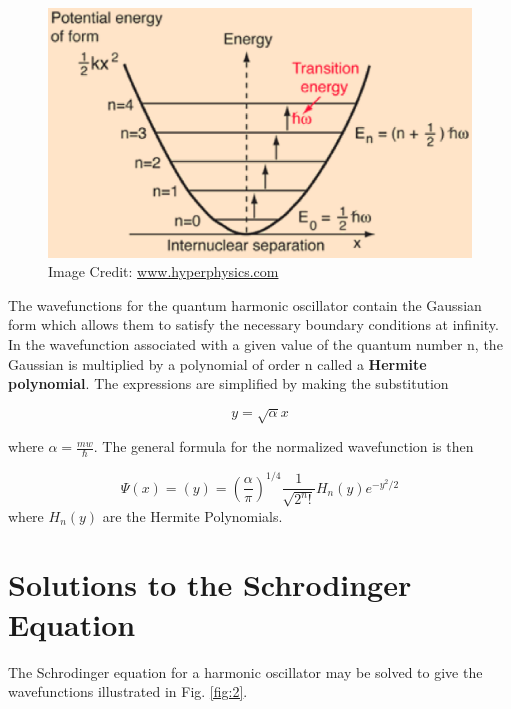 \documentclass{article}
\begin{document}
\begin{figure}[h]
\begin{center}
\includegraphics[scale=0.65]{./potwell}
\end{center}
\caption{Image Credit: \url{www.hyperphysics.com}}
\label{fig:1}
\end{figure}

\noindent
The wavefunctions for the quantum harmonic oscillator contain the Gaussian form which allows them to
satisfy the necessary boundary conditions at infinity. In the wavefunction associated with a given value of the
quantum number n, the Gaussian is multiplied by a polynomial of order n called a \textbf{Hermite polynomial}.
The expressions are simplified by making the substitution

\begin{equation}
\label{eq:6}
y = \sqrt{\alpha}x
\end{equation}

where $\alpha= \frac{mw}{\hbar}$. The general formula for the normalized wavefunction is then

\begin{equation}
\label{eq:7}
\Psi(x) = (y) = (\frac{\alpha}{\pi})^{1/4} \frac{1}{\sqrt{2^n !}} H_{n}(y) e^{-y^2 / 2}
\end{equation}
where $H_{n}(y)$ are the Hermite Polynomials.


\section{Solutions to the Schrodinger Equation}
The Schrodinger equation for a harmonic oscillator may be solved to give the wavefunctions illustrated in Fig. \ref{fig:2}.
\end{document}
